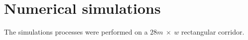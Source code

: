 \section{\label{simulations}Numerical simulations}

The simulations processes were performed on a $28m~\times~w$ rectangular corridor.  

